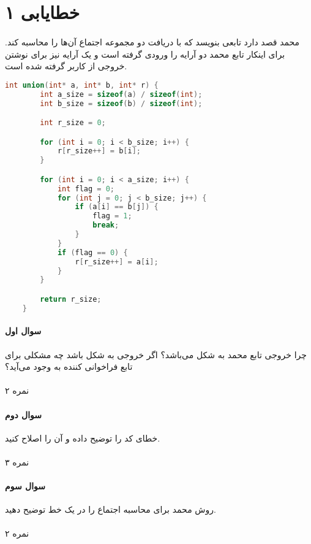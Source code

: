 \documentclass[../main.tex]{subfiles}
\begin{document}
\section{خطایابی ۱}
\paragraph{}
محمد قصد دارد تابعی بنویسد که با دریافت دو مجموعه اجتماع آن‌ها را محاسبه کند.
برای اینکار تابع محمد دو آرایه را ورودی گرفته است
و یک آرایه نیز برای نوشتن خروجی از کاربر گرفته شده است.

\begin{latin}
\begin{lstlisting}[language=c]
    int union(int* a, int* b, int* r) {
        int a_size = sizeof(a) / sizeof(int);
        int b_size = sizeof(b) / sizeof(int);

        int r_size = 0;

        for (int i = 0; i < b_size; i++) {
            r[r_size++] = b[i];
        }

        for (int i = 0; i < a_size; i++) {
            int flag = 0;
            for (int j = 0; j < b_size; j++) {
                if (a[i] == b[j]) {
                    flag = 1;
                    break;
                }
            }
            if (flag == 0) {
                r[r_size++] = a[i];
            }
        }

        return r_size;
    }
\end{lstlisting}
\end{latin}

\paragraph{سوال اول}
چرا خروجی تابع محمد به شکل 
می‌باشد؟ اگر خروجی به شکل  باشد چه مشکلی برای تابع فراخوانی کننده به وجود می‌آید؟

\paragraph{}
۲ نمره

\paragraph{سوال دوم}
خطای کد را توضیح داده و آن را اصلاح کنید.

\paragraph{}
۳ نمره

\paragraph{سوال سوم}
روش محمد برای محاسبه اجتماع را در یک خط توضیح دهید.

\paragraph{}
۲ نمره
\end{document}
